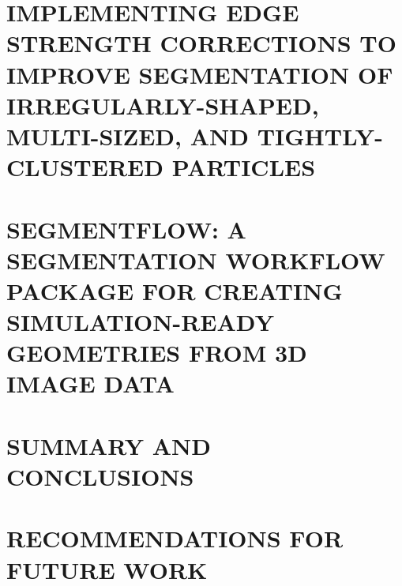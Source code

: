 \documentclass[letterpaper,12pt]{article} %
\begin{document}
\newpage
\chapter{
    IMPLEMENTING EDGE STRENGTH CORRECTIONS TO IMPROVE SEGMENTATION OF
    IRREGULARLY-SHAPED, MULTI-SIZED, AND TIGHTLY-CLUSTERED PARTICLES
    \label{ch/seg}
}







\newpage
\chapter{
    SEGMENTFLOW: A SEGMENTATION WORKFLOW PACKAGE FOR CREATING
    SIMULATION-READY GEOMETRIES FROM 3D IMAGE DATA} \label{ch/sf}







\chapter{SUMMARY AND CONCLUSIONS} \label{ch/summary}


\chapter{RECOMMENDATIONS FOR FUTURE WORK} \label{ch/future}



\backmatter     %
\end{document}
